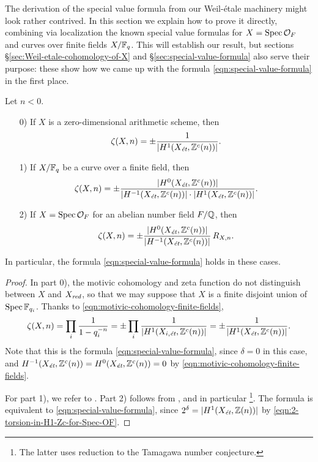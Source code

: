 \documentclass{article}
\numberwithin{equation}{section}
\begin{document}
The derivation of the special value formula from our Weil-étale machinery might
look rather contrived. In this section we explain how to prove it directly,
combining via localization the known special value formulas for
$X = \Spec \mathcal{O}_F$ and curves over finite fields $X/\FF_q$. This will
establish our result, but sections \S\ref{sec:Weil-etale-cohomology-of-X} and
\S\ref{sec:special-value-formula} also serve their purpose: these show how we
came up with the formula \eqref{eqn:special-value-formula} in the first place.

\begin{lemma}
  \label{lemma:elementary-proof-1}
  Let $n < 0$.

  \begin{enumerate}
  \item[0)] If $X$ is a zero-dimensional arithmetic scheme, then
    $$\zeta (X,n) = \pm \frac{1}{|H^1 (X_\et, \ZZ^c (n))|}.$$

  \item[1)] If $X/\FF_q$ be a curve over a finite field, then
    \[ \zeta (X,n) =
      \pm\frac{|H^0 (X_\et, \ZZ^c(n))|}{|H^{-1} (X_\et, \ZZ^c(n))|\cdot |H^1 (X_\et, \ZZ^c(n))|}. \]

  \item[2)] If $X = \Spec \mathcal{O}_F$ for an abelian number field $F/\QQ$,
    then
    \[ \zeta (X,n) = \pm\frac{|H^0 (X_\et, \ZZ^c(n))|}{|H^{-1} (X_\et, \ZZ^c(n))|}\,R_{X,n}. \]
  \end{enumerate}

  In particular, the formula \eqref{eqn:special-value-formula} holds in these
  cases.

  \begin{proof}
    In part 0), the motivic cohomology and zeta function do not distinguish
    between $X$ and $X_\red$, so that we may suppose that $X$ is a finite
    disjoint union of $\Spec \FF_{q_i}$. Thanks to
    \eqref{eqn:motivic-cohomology-finite-fields},
    \[ \zeta (X,n) = \prod_i \frac{1}{1 - q_i^{-n}} =
      \pm \prod_i \frac{1}{|H^1 (X_{i,\et}, \ZZ^c (n))|} =
      \pm \frac{1}{|H^1 (X_\et, \ZZ^c (n))|}. \]
    Note that this is the formula \eqref{eqn:special-value-formula},
    since $\delta = 0$ in this case, and
    $H^{-1} (X_\et, \ZZ^c (n)) = H^0 (X_\et, \ZZ^c (n)) = 0$ by
    \eqref{eqn:motivic-cohomology-finite-fields}.

    \vspace{1em}

    For part 1), we refer to \cite[\S 5]{Beshenov-Weil-etale-2}.
    Part 2) follows from \cite[\S 5.8.3]{Flach-Morin-2018}, and in particular
    \cite[Proposition~5.35]{Flach-Morin-2018}\footnote{The latter uses reduction
      to the Tamagawa number conjecture.}.
    The formula is equivalent to \eqref{eqn:special-value-formula}, since
    $2^\delta = |H^1 (X_\et, \ZZ (n))|$ by
    \eqref{eqn:2-torsion-in-H1-Zc-for-Spec-OF}.
  \end{proof}
\end{lemma}
\end{document}
